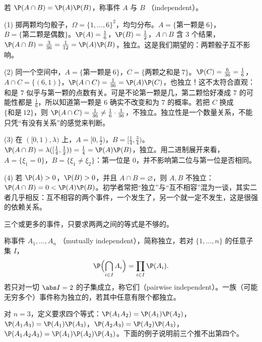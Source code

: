 
\begin{definition}[两个事件的独立性]\label{def:independence:two-events}
若 $\P(A\cap B)=\P(A)\P(B)$，称事件 $A$ 与 $B$ （independent）。
\end{definition}

\begin{example}\label{ex:independence:two-events}
(1) 掷两颗均匀骰子，$\Omega=\{1,\dots,6\}^2$，均匀分布。$A=\{\text{第一颗是}\ 6\}$，$B=\{\text{第二颗是偶数}\}$。$\P(A)=\frac16$，$\P(B)=\frac12$，$A\cap B$ 含 $3$ 个结果，$\P(A\cap B)=\frac3{36}=\frac1{12}=\P(A)\P(B)$，独立。这是我们期望的：两颗骰子互不影响。

(2) 同一个空间中，$A=\{\text{第一颗是}\ 6\}$，$C=\{\text{两颗之和是}\ 7\}$。$\P(C)=\frac6{36}=\frac16$，$A\cap C=\{(6,1)\}$，$\P(A\cap C)=\frac1{36}=\P(A)\P(C)$，也独立！这不太符合直观：和是 $7$ 似乎与第一颗的点数有关。可是不论第一颗是几，第二颗恰好凑成 $7$ 的可能性都是 $\frac16$，所以知道第一颗是 $6$ 确实不改变和为 $7$ 的概率。若把 $C$ 换成 $\{\text{和是}\ 12\}$，则 $\P(A\cap C)=\frac1{36}\neq\frac16\cdot\frac1{36}$，不独立。独立性是一个数量关系，不能只凭“有没有关系”的感觉来判断。

(3) 在 $([0,1),\lambda)$ 上，$A=[0,\frac12)$，$B=[\frac14,\frac34)$。$\P(A\cap B)=\lambda([\frac14,\frac12))=\frac14=\P(A)\P(B)$，独立。用二进制展开来看，$A=\{\xi_1=0\}$，$B=\{\xi_1\neq\xi_2\}$：第一位是 $0$，并不影响第二位与第一位是否相同。

(4) 若 $\P(A)>0$，$\P(B)>0$，并且 $A\cap B=\varnothing$，则 $A,B$ 不独立：$\P(A\cap B)=0<\P(A)\P(B)$。初学者常把“独立”与“互不相容”混为一谈，其实二者几乎相反：互不相容的两个事件，一个发生了，另一个就一定不发生，这是很强的依赖关系。
\end{example}

三个或更多的事件，只要求两两之间的等式是不够的。

\begin{definition}[多个事件的独立性]\label{def:independence:events}
称事件 $A_1,\dots,A_n$ （mutually independent），简称独立，若对 $\{1,\dots,n\}$ 的任意子集 $I$，
\[
\P\Bigl(\bigcap_{i\in I}A_i\Bigr)=\prod_{i\in I}\P(A_i).
\]
若只对一切 $\abs I=2$ 的子集成立，称它们（pairwise independent）。一族（可能无穷多个）事件称为独立的，若其中任意有限个都独立。
\end{definition}

对 $n=3$，定义要求四个等式：$\P(A_1A_2)=\P(A_1)\P(A_2)$，$\P(A_1A_3)=\P(A_1)\P(A_3)$，$\P(A_2A_3)=\P(A_2)\P(A_3)$，$\P(A_1A_2A_3)=\P(A_1)\P(A_2)\P(A_3)$。下面的例子说明前三个推不出第四个。

